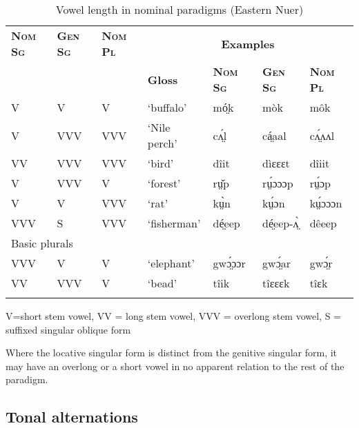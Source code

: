 \documentclass[output=paper,newtxmath,modfonts,nonflat,draftmode]{langsci/langscibook}
\begin{document}
\begin{table}
\begin{tabularx}{\textwidth}{lllXlll}
\lsptoprule

\bfseries\scshape Nom Sg & \bfseries\scshape Gen Sg & \bfseries\scshape Nom Pl & \multicolumn{4}{c}{\bfseries Examples}\\
\cmidrule{4-7}
&  &  & \bfseries Gloss & \bfseries\scshape Nom Sg & \bfseries\scshape Gen Sg & \bfseries\scshape Nom Pl\\
\midrule
V & V & V & ‘buffalo’ & mó̤k & mòk & môk\\
V & VVV & VVV & ‘Nile perch’ & cʌ̤́l  & cá̤aal & cʌ̤́ʌʌl\\
VV & VVV & VVV & ‘bird’ & dîit & dìɛɛɛt & dîiit\\
V & VVV & V & ‘forest’ & rṳ̌p & rṳ́ɔɔɔp & rṳ́ɔp\\
V & V & VVV & ‘rat’ & kṳ̀n & kṳ́ɔn & kṳ́ɔɔɔn\\
VVV & S & VVV & ‘fisherman’ & dé̤eep & dé̤eep-ʌ̤̀ & dêeep\\
\midrule
\multicolumn{7}{l}{Basic plurals}\\
\midrule
VVV & V & V & ‘elephant’ & gwɔ̤́ɔɔr & gwɔ̤́ar & gwɔ̤́r\\
VV & VVV & V & ‘bead’ & tîik & tîɛɛɛk & tîɛk\\
\lspbottomrule
\end{tabularx}
\caption{Vowel length in nominal paradigms (Eastern Nuer)}
\label{tab:monich:20}
\parbox{\textwidth}{\small\raggedright V=short stem vowel, VV = long stem vowel, VVV = overlong stem vowel, S = suffixed singular oblique form}
\end{table}
Where the locative singular form is distinct from the genitive singular form, it may have an overlong or a short vowel in no apparent relation to the rest of the paradigm.

\subsection{Tonal alternations}
\end{document}
